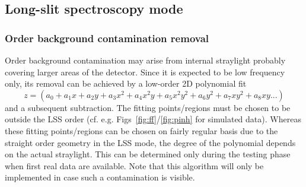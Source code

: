 \subsection{Long-slit spectroscopy mode}
\label{ssec:algo_lss_spectroscopy}

\subsubsection{Order background contamination removal}\label{ssec:orderbg}
Order background contamination may arise from internal straylight probably covering larger areas of the detector. Since it is expected to be low frequency only, its removal can be achieved by a low-order 2D polynomial fit 
\begin{equation}
    z = (a_0 + a_1x + a_2y + a_3x^2 + a_4x^2y + a_5x^2y^2 + a_6y^2 + a_7xy^2 + a_8xy ...)
\end{equation}
and a subsequent subtraction. The fitting points/regions must be chosen to be outside the \ac{LSS} order (cf. e.g. Figs~\ref{fig:ff}/\ref{fig:pinh} for simulated data). Whereas these fitting points/regions can be chosen on fairly regular basis due to the straight order geometry in the \ac{LSS} mode, the degree of the polynomial depends on the actual straylight. This can be determined only during the testing phase when first real data are available. Note that this algorithm will only be implemented in case such a contamination is visible.

